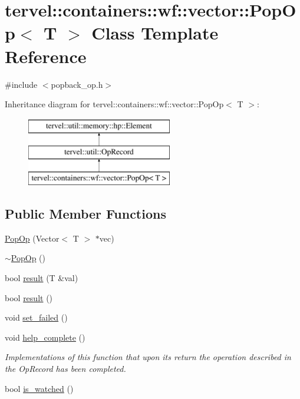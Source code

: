 \hypertarget{classtervel_1_1containers_1_1wf_1_1vector_1_1_pop_op}{}\section{tervel\+:\+:containers\+:\+:wf\+:\+:vector\+:\+:Pop\+Op$<$ T $>$ Class Template Reference}
\label{classtervel_1_1containers_1_1wf_1_1vector_1_1_pop_op}


{\ttfamily \#include $<$popback\+\_\+op.\+h$>$}

Inheritance diagram for tervel\+:\+:containers\+:\+:wf\+:\+:vector\+:\+:Pop\+Op$<$ T $>$\+:\begin{figure}[H]
\begin{center}
\leavevmode
\includegraphics[height=3.000000cm]{classtervel_1_1containers_1_1wf_1_1vector_1_1_pop_op}
\end{center}
\end{figure}
\subsection*{Public Member Functions}
\begin{DoxyCompactItemize}
\item 
\hyperlink{classtervel_1_1containers_1_1wf_1_1vector_1_1_pop_op_acec5a8f43e480109f9e4c7edcdada373}{Pop\+Op} (Vector$<$ T $>$ $\ast$vec)
\item 
\hyperlink{classtervel_1_1containers_1_1wf_1_1vector_1_1_pop_op_afe1ff098c9530cdc332b6c5af646b435}{$\sim$\+Pop\+Op} ()
\item 
bool \hyperlink{classtervel_1_1containers_1_1wf_1_1vector_1_1_pop_op_a71d9e27ccf6ec78d6001e630b9357e5b}{result} (T \&val)
\item 
bool \hyperlink{classtervel_1_1containers_1_1wf_1_1vector_1_1_pop_op_a2312e7a8857bbf35e3c97df89ca72598}{result} ()
\item 
void \hyperlink{classtervel_1_1containers_1_1wf_1_1vector_1_1_pop_op_ac997893b45ab02efe3c2e705bc4a24ae}{set\+\_\+failed} ()
\item 
void \hyperlink{classtervel_1_1containers_1_1wf_1_1vector_1_1_pop_op_abd820a976a7f356f87ed8dadddef12c4}{help\+\_\+complete} ()
\begin{DoxyCompactList}\small\item\em Implementations of this function that upon its return the operation described in the Op\+Record has been completed. \end{DoxyCompactList}\item 
bool \hyperlink{classtervel_1_1containers_1_1wf_1_1vector_1_1_pop_op_a33e196246b45105b1a7be0f7f3e4cd35}{is\+\_\+watched} ()
\end{DoxyCompactItemize}
